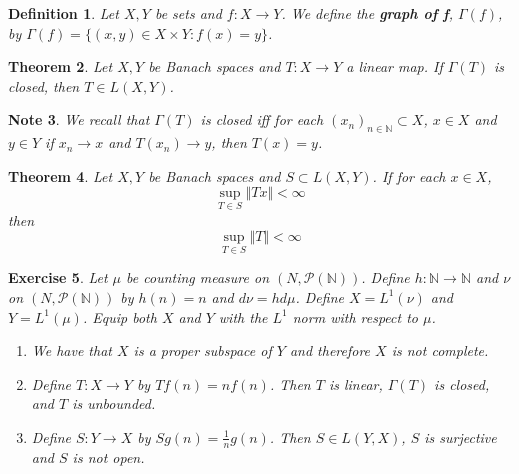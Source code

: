 \documentclass[12pt]{amsart}
\newtheorem{thm}{Theorem}[section]
\newtheorem{defn}[thm]{Definition}
\newtheorem{note}[thm]{Note}
\newtheorem{ex}[thm]{Exercise}
\newcommand{\Gam}{\Gamma}
\newcommand{\N}{\mathbb{N}}
\newcommand{\MP}{\mathcal{P}}
\newcommand{\conv}[1]{\xrightarrow{#1}}
\newcommand{\n}{\Vert}
\begin{document}
\begin{defn}
Let $X,Y$ be sets and $f:X \rightarrow Y$. We define the \textbf{graph of f}, $\Gam(f)$, by $\Gam(f) = \{(x,y) \in X \times Y: f(x) = y\}$.
\end{defn}

\begin{thm}
Let $X, Y$ be Banach spaces and $T:X \rightarrow Y$ a linear map. If $\Gam(T)$ is closed, then $T \in L(X,Y)$.  
\end{thm}

\begin{note}
We recall that $\Gam(T)$ is closed iff for each $(x_n)_{n \in \N} \subset X$, $x \in X$ and $y \in Y$ if $x_n \conv{} x$ and $T(x_n) \conv{} y$, then $T(x) = y$. 
\end{note}

\begin{thm}

Let $X, Y$ be Banach spaces and $S \subset L(X,Y)$. If for each $x \in X$, $$\sup_{T \in S} \n Tx \n < \infty$$ then $$\sup_{T \in S} \n T \n < \infty$$
\end{thm}

\begin{ex}
Let $\mu$ be counting measure on $(N, \MP(\N))$. Define $h: \N \rightarrow \N$ and $ \nu$ on $(N, \MP(\N))$ by $h(n) = n$ and $d \nu = h d \mu$. Define $X=L^1(\nu)$ and $Y = L^1(\mu)$. Equip both $X$ and $Y$ with the $L^1$ norm with respect to $\mu$. 
\begin{enumerate}
\item We have that $X$ is a proper subspace of $Y$ and therefore $X$ is not complete.
\item Define $T: X \rightarrow Y$ by $Tf(n) = nf(n)$. Then $T$ is linear, $\Gam(T)$ is closed, and $T$ is unbounded.
\item Define $S:Y \rightarrow X$ by $Sg(n) = \frac{1}{n}g(n)$. Then $S \in L(Y,X)$, $S$ is surjective and $S$ is not open. 
\end{enumerate}
\end{ex}
\end{document}
